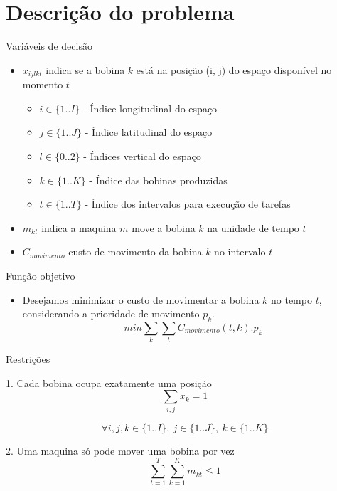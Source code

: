 \section{Descrição do problema}

\begin{frame}{Variáveis de decisão}
    \begin{itemize}
        \item $x_{ijlkt}$ indica se a bobina $k$ está na posição (i, j) do espaço disponível no momento $t$
\begin{itemize}
    \item $i \in \{1..I\}$ - Índice longitudinal do espaço
    \item $j \in \{1..J\}$ - Índice latitudinal do espaço
    \item $l \in \{0..2\}$ - Índices vertical do espaço
    \item $k \in \{1..K\}$ - Índice das bobinas produzidas
    \item $t \in \{1..T\}$ - Índice dos intervalos para execução de tarefas
\end{itemize}
        \item $m_{kt}$ indica a maquina $m$ move a bobina $k$ na unidade de tempo $t$
        \item $C_{movimento}$ custo de movimento da bobina $k$ no intervalo $t$
    \end{itemize}
\end{frame}

\begin{frame}{Função objetivo}
\begin{itemize}
    \item Desejamos minimizar o custo de movimentar a bobina $k$ no tempo $t$, considerando a prioridade de movimento $p_k$.
    $$min \sum_k\sum_tC_{movimento}(t, k). p_k$$
\end{itemize}
\end{frame}

\begin{frame}{Restrições}
    \begin{block}{1. Cada bobina ocupa exatamente uma posição}
       $$\sum_{i,j}x_{k} = 1$$
        
        $$\forall i,j,k \in \{1..I\},\ j \in \{1..J\},\ k \in \{1..K\}$$
    \end{block}

    \begin{block}{2. Uma maquina só pode mover uma bobina por vez}
        $$\sum_{t = 1}^T\sum_{k=1}^Km_{kt} \leq 1$$
    \end{block}
\end{frame}

